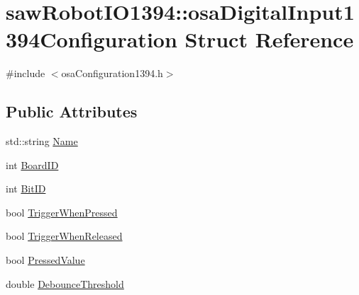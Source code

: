 \hypertarget{structsaw_robot_i_o1394_1_1osa_digital_input1394_configuration}{\section{saw\-Robot\-I\-O1394\-:\-:osa\-Digital\-Input1394\-Configuration Struct Reference}
\label{structsaw_robot_i_o1394_1_1osa_digital_input1394_configuration}
}


{\ttfamily \#include $<$osa\-Configuration1394.\-h$>$}

\subsection*{Public Attributes}
\begin{DoxyCompactItemize}
\item 
std\-::string \hyperlink{structsaw_robot_i_o1394_1_1osa_digital_input1394_configuration_aaddb057ed9582c51edfc373d1d58edaa}{Name}
\item 
int \hyperlink{structsaw_robot_i_o1394_1_1osa_digital_input1394_configuration_a30b36233cc06e03d251f90131dd953fd}{Board\-I\-D}
\item 
int \hyperlink{structsaw_robot_i_o1394_1_1osa_digital_input1394_configuration_a92c84800ba56b8a03122b938713fc2dc}{Bit\-I\-D}
\item 
bool \hyperlink{structsaw_robot_i_o1394_1_1osa_digital_input1394_configuration_aa4c2fb5015bf09a92f11d3e80580951b}{Trigger\-When\-Pressed}
\item 
bool \hyperlink{structsaw_robot_i_o1394_1_1osa_digital_input1394_configuration_a8422056c0ee6a2e53ecced0d79efe1b8}{Trigger\-When\-Released}
\item 
bool \hyperlink{structsaw_robot_i_o1394_1_1osa_digital_input1394_configuration_a61f1b148dcece33e512f16d9f2865f56}{Pressed\-Value}
\item 
double \hyperlink{structsaw_robot_i_o1394_1_1osa_digital_input1394_configuration_afbdaea0a87c9658a0bb4ab161e3e87a3}{Debounce\-Threshold}
\end{DoxyCompactItemize}



